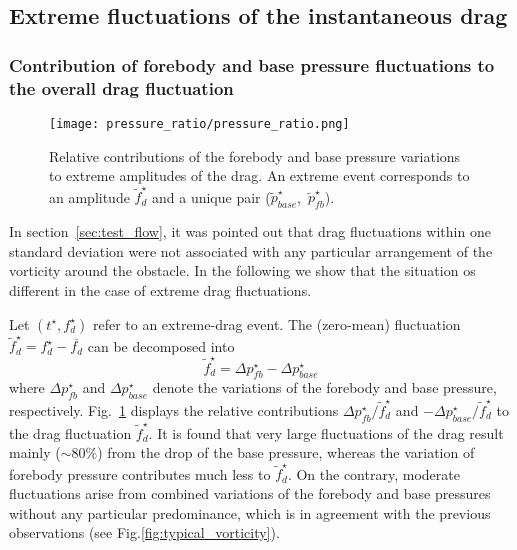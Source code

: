 \subsection{Extreme fluctuations of the instantaneous drag}
\label{sec:instantaneous_drag}

\subsubsection{Contribution of forebody and base pressure fluctuations to the overall drag fluctuation}
\label{sec:forebody_and_base_contribution}

\begin{figure}
	\centering
	\texttt{[image: pressure\_ratio/pressure\_ratio.png]}
	\caption{\label{fig:pressure_ratio} Relative contributions of the forebody and base pressure variations to extreme amplitudes of the drag. An extreme event corresponds to an amplitude $\tilde f^{\star}_d$ and a unique pair  ($\tilde{p}^{\star}_{base}$,~$\tilde{p}^{\star}_{fb}$).}
\end{figure}

%
In section~\ref{sec:test_flow}, it was pointed out that drag fluctuations within one standard deviation were not associated with any particular arrangement of the vorticity around the obstacle.
In the following we show that the situation os different in the case of extreme drag fluctuations.

%
Let $(t^{\star}, f_d^{\star})$ refer to an extreme-drag event.
The (zero-mean) fluctuation $\tilde{f}_d^{\star} = f_d^{\star} - \overline{f_d}$ can be  decomposed into
\begin{equation}
\tilde{f}_d^{\star} = \Delta p_{fb}^{\star} - \Delta p_{base}^{\star}
\end{equation}
where $\Delta p_{fb}^{\star}$ and $\Delta p_{base}^{\star}$ denote the variations of the forebody and base pressure, respectively.
%
Fig.~\ref{fig:pressure_ratio} displays the relative contributions
$\Delta p_{fb}^{\star}/\tilde{f}_d^{\star}$ and $-\Delta p_{base}^{\star}/\tilde{f}_d^{\star}$ to the drag fluctuation $\tilde f_d^{\star}$.
It is found that very large fluctuations of the drag result mainly ($\sim 80\%$) from the drop of the base pressure, whereas the variation of forebody pressure contributes much less to $\tilde{f}_d^{\star}$.
On the contrary, moderate fluctuations arise from combined variations of the forebody and base pressures without any particular predominance, which is in agreement with the previous observations (see Fig.\ref{fig:typical_vorticity}).

